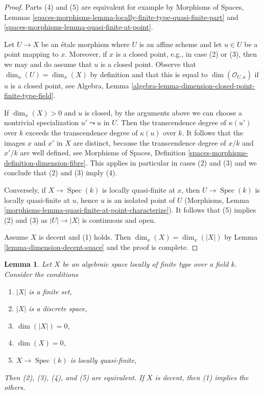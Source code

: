 \documentclass{stacks-project}
\theoremstyle{plain}
\newtheorem{lemma}[subsection]{Lemma}
\theoremstyle{definition}
\theoremstyle{remark}
\numberwithin{equation}{subsection}
\def\Spec{\mathop{\mathrm{Spec}}}
\begin{document}
\begin{proof}
Parts (4) and (5) are equivalent for example by
Morphisms of Spaces, Lemmas
\ref{spaces-morphisms-lemma-locally-finite-type-quasi-finite-part} and
\ref{spaces-morphisms-lemma-quasi-finite-at-point}.

\medskip\noindent
Let $U \to X$ be an \'etale morphism where $U$ is an affine scheme and let
$u \in U$ be a point mapping to $x$. Moreover, if $x$ is a closed
point, e.g., in case (2) or (3), then we may and do assume that $u$
is a closed point. Observe that $\dim_u(U) = \dim_x(X)$ by definition
and that this is equal to $\dim(\mathcal{O}_{U, u})$ if $u$ is a closed
point, see Algebra, Lemma
\ref{algebra-lemma-dimension-closed-point-finite-type-field}.

\medskip\noindent
If $\dim_x(X) > 0$ and $u$ is closed, by the arguments above
we can choose a nontrivial
specialization $u' \leadsto u$ in $U$. Then the transcendence degree
of $\kappa(u')$ over $k$ exceeds the transcendence degree of
$\kappa(u)$ over $k$. It follows that the images $x$ and $x'$ in $X$
are distinct, because the transcendence degree of $x/k$ and $x'/k$
are well defined, see Morphisms of Spaces, Definition
\ref{spaces-morphisms-definition-dimension-fibre}.
This applies in particular in cases (2) and (3) and we
conclude that (2) and (3) imply (4).

\medskip\noindent
Conversely, if $X \to \Spec(k)$ is locally quasi-finite at $x$, then
$U \to \Spec(k)$ is locally quasi-finite at $u$, hence $u$ is an
isolated point of $U$
(Morphisms, Lemma \ref{morphisms-lemma-quasi-finite-at-point-characterize}).
It follows that (5) implies (2) and (3) as
$|U| \to |X|$ is continuous and open.

\medskip\noindent
Assume $X$ is decent and (1) holds. Then $\dim_x(X) = \dim_x(|X|)$
by Lemma \ref{lemma-dimension-decent-space} and the proof is complete.
\end{proof}

\begin{lemma}
\label{lemma-conditions-on-space-over-field}
Let $X$ be an algebraic space locally of finite type over a field $k$.
Consider the conditions
\begin{enumerate}
\item $|X|$ is a finite set,
\item $|X|$ is a discrete space,
\item $\dim(|X|) = 0$,
\item $\dim(X) = 0$,
\item $X \to \Spec(k)$ is locally quasi-finite,
\end{enumerate}
Then (2), (3), (4), and (5) are equivalent.
If $X$ is decent, then (1) implies the others.
\end{lemma}
\end{document}
